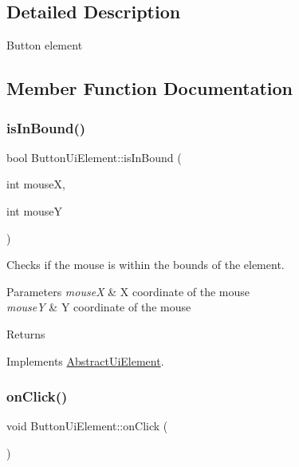 \subsection{Detailed Description}
Button element 



\subsection{Member Function Documentation}
\mbox{\label{class_button_ui_element_ab321d646770df66f7ea58a7246d7bf28}} 
\subsubsection{\texorpdfstring{is\+In\+Bound()}{isInBound()}}
{\footnotesize\ttfamily bool Button\+Ui\+Element\+::is\+In\+Bound (\begin{DoxyParamCaption}\item[{int}]{mouseX,  }\item[{int}]{mouseY }\end{DoxyParamCaption})\hspace{0.3cm}{\ttfamily [virtual]}}



Checks if the mouse is within the bounds of the element. 


\begin{DoxyParams}{Parameters}
{\em mouseX} & X coordinate of the mouse\\
\hline
{\em mouseY} & Y coordinate of the mouse\\
\hline
\end{DoxyParams}
\begin{DoxyReturn}{Returns}

\end{DoxyReturn}


Implements \mbox{\hyperlink{class_abstract_ui_element_ad2c415461cd7e8c1ee50b1105eb84685}{Abstract\+Ui\+Element}}.

\mbox{\label{class_button_ui_element_a06c748ef9e81216f76d7db936d320365}} 
\subsubsection{\texorpdfstring{on\+Click()}{onClick()}}
{\footnotesize\ttfamily void Button\+Ui\+Element\+::on\+Click (\begin{DoxyParamCaption}{ }\end{DoxyParamCaption})\hspace{0.3cm}{\ttfamily [virtual]}}



